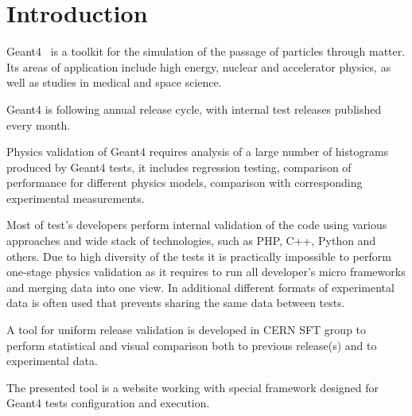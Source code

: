 \section{Introduction}
\label{sec-introduction}
Geant4~\cite{Geant4} is a toolkit for the simulation of the passage of particles through matter. Its areas of application include high energy, nuclear and accelerator physics, as well as studies in medical and space science. 

Geant4 is following annual release cycle, with internal test releases published every month.

Physics validation of Geant4 requires analysis of a large number of histograms produced by Geant4 tests, it includes regression testing, comparison of performance for different physics models, comparison with corresponding experimental measurements. 

Most of test's developers perform internal validation of the code using various approaches and wide stack of technologies, such as PHP, C++, Python and others. Due to high diversity of the tests it is practically impossible to perform one-stage physics validation as it requires to run all developer's micro frameworks and merging data into one view. In additional different formats of experimental data is often used that prevents sharing the same data between tests.

A tool for uniform release validation is developed in CERN SFT group to perform statistical and visual comparison both to previous release(s) and to experimental data. 

The presented tool is a website working with special framework designed for Geant4 tests configuration and execution.
